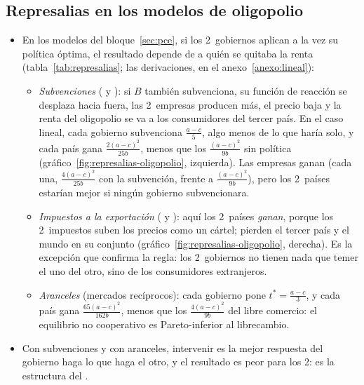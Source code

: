 \documentclass[11pt]{article}
\begin{document}
\subsection{Represalias en los modelos de oligopolio}\label{sec:represalias}

\begin{itemize}
\item En los modelos del bloque~\ref{sec:pce}, si los 2~gobiernos aplican a la vez su política óptima, el resultado depende de a quién se quitaba la renta (tabla~\ref{tab:represalias}; las derivaciones, en el anexo~\ref{anexo:lineal}):
  \begin{itemize}
  \item \emph{Subvenciones} ( y ): si $B$ también subvenciona, su función de reacción se desplaza hacia fuera, las 2~empresas producen más, el precio baja y la renta del oligopolio se va a los consumidores del tercer país. En el caso lineal, cada gobierno subvenciona $\frac{a-c}{5}$, algo menos de lo que haría solo, y cada país gana $\frac{2(a-c)^2}{25b}$, menos que los $\frac{(a-c)^2}{9b}$ sin política (gráfico~\ref{fig:represalias-oligopolio}, izquierda). Las empresas ganan (cada una, $\frac{4(a-c)^2}{25b}$ con la subvención, frente a $\frac{(a-c)^2}{9b}$), pero los 2~países estarían mejor si ningún gobierno subvencionara.
  \item \emph{Impuestos a la exportación} ( y ): aquí los 2~países \emph{ganan}, porque los 2~impuestos suben los precios como un cártel; pierden el tercer país y el mundo en su conjunto (gráfico~\ref{fig:represalias-oligopolio}, derecha). Es la excepción que confirma la regla: los 2~gobiernos no tienen nada que temer el uno del otro, sino de los consumidores extranjeros.
  \item \emph{Aranceles} (mercados recíprocos): cada gobierno pone $t^*=\frac{a-c}{3}$, y cada país gana $\frac{65(a-c)^2}{162b}$, menos que los $\frac{4(a-c)^2}{9b}$ del libre comercio: el equilibrio no cooperativo es Pareto-inferior al librecambio\nocite{BranderSpencer1984Trade,Brander1995Strategic}.
  \end{itemize}
\item Con subvenciones y con aranceles, intervenir es la mejor respuesta del gobierno haga lo que haga el otro, y el resultado es peor para los 2: es la estructura del  .
\end{itemize}
\end{document}

